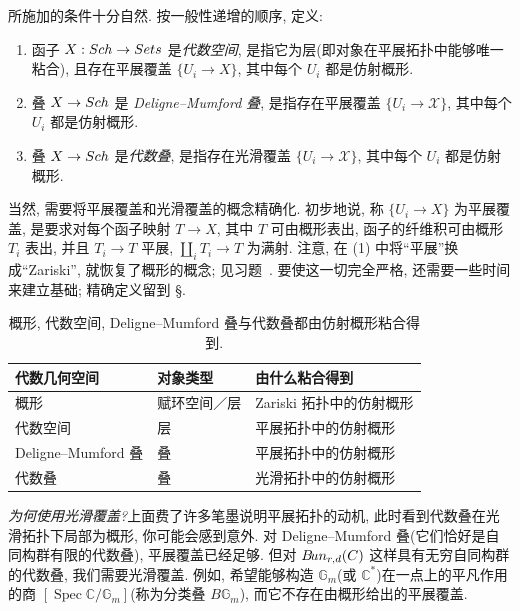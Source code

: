 所施加的条件十分自然. 按一般性递增的顺序, 定义: 
\begin{enumerate}[(1)]
\item 函子 $X:Sch\to Sets$ 是\textit{代数空间}, 是指它为层(即对象在平展拓扑中能够唯一粘合), 且存在平展覆盖 $\{U_i\to X\}$, 其中每个 $U_i$ 都是仿射概形.
\item 叠 $X\to Sch$ 是 \textit{Deligne--Mumford 叠}, 是指存在平展覆盖 $\{U_i\to\mathcal X\}$, 其中每个 $U_i$ 都是仿射概形.
\item 叠 $X\to Sch$ 是\textit{代数叠}, 是指存在光滑覆盖 $\{U_i\to\mathcal X\}$, 其中每个 $U_i$ 都是仿射概形.
\end{enumerate}
当然, 需要将平展覆盖和光滑覆盖的概念精确化. 初步地说, 称 $\{U_i\to X\}$ 为平展覆盖, 是要求对每个函子映射 $T\to X$, 其中 $T$ 可由概形表出, 函子的纤维积可由概形 $T_i$ 表出, 并且 $T_i\to T$ 平展, $\coprod_i T_i\to T$ 为满射. 注意, 在 (1) 中将``平展''换成``Zariski'', 就恢复了概形的概念; 见习题~. 要使这一切完全严格, 还需要一些时间来建立基础; 精确定义留到 \S{}.
\begin{table}[H]
\centering
\begin{tabularx}{\textwidth}{@{}X X X@{}}
\toprule
代数几何空间 & 对象类型 & 由什么粘合得到\\
\midrule
概形 & 赋环空间／层 & Zariski 拓扑中的仿射概形\\
代数空间 & 层 & 平展拓扑中的仿射概形\\
Deligne--Mumford 叠 & 叠 & 平展拓扑中的仿射概形\\
代数叠 & 叠 & 光滑拓扑中的仿射概形\\
\bottomrule
\end{tabularx}
\caption{概形, 代数空间, Deligne--Mumford 叠与代数叠都由仿射概形粘合得到.}\label{src:1.6.5}
\end{table}
\textit{为何使用光滑覆盖?}上面费了许多笔墨说明平展拓扑的动机, 此时看到代数叠在光滑拓扑下局部为概形, 你可能会感到意外. 对 Deligne--Mumford 叠(它们恰好是自同构群有限的代数叠), 平展覆盖已经足够. 但对 $B\!un_{r,d}(C)$ 这样具有无穷自同构群的代数叠, 我们需要光滑覆盖. 例如, 希望能够构造 $\mathbb G_m$(或 $\mathbb C^*$)在一点上的平凡作用的商 $[\operatorname{Spec}\mathbb C/\mathbb G_m]$(称为分类叠 $B\mathbb G_m$), 而它不存在由概形给出的平展覆盖.

